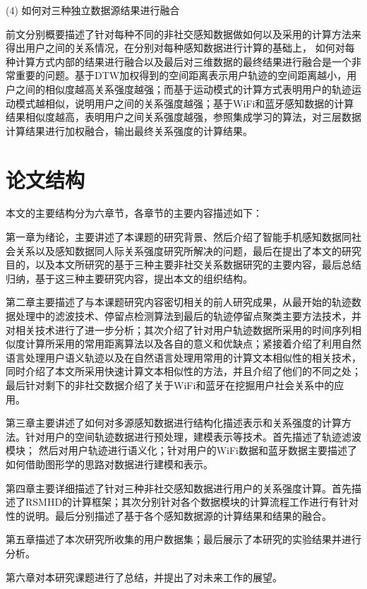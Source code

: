 \par (4) 如何对三种独立数据源结果进行融合
\par 前文分别概要描述了针对每种不同的非社交感知数据做如何以及采用的计算方法来得出用户之间的关系情况，在分别对每种感知数据进行计算的基础上， 如何对每种计算方式内部的结果进行融合以及最后对三维数据的最终结果进行融合是一个非常重要的问题。基于DTW加权得到的空间距离表示用户轨迹的空间距离越小，用户之间的相似度越高关系强度越强；而基于运动模式的计算方式表明用户的轨迹运动模式越相似，说明用户之间的关系强度越强；基于WiFi和蓝牙感知数据的计算结果相似度越高，表明用户之间关系强度越强，参照集成学习的算法，对三层数据计算结果进行加权融合，输出最终关系强度的计算结果。
\section{论文结构}
本文的主要结构分为六章节，各章节的主要内容描述如下：
\par 第一章为绪论，主要讲述了本课题的研究背景、然后介绍了智能手机感知数据同社会关系以及感知数据同人际关系强度研究所解决的问题，最后在提出了本文的研究目的，以及本文所研究的基于三种主要非社交关系数据研究的主要内容，最后总结归纳，基于这三种主要研究内容，提出本文的组织结构。
\par 第二章主要描述了与本课题研究内容密切相关的前人研究成果，从最开始的轨迹数据处理中的滤波技术、停留点检测算法到最后的轨迹停留点聚类主要方法技术，并对相关技术进行了进一步分析；其次介绍了针对用户轨迹数据所采用的时间序列相似度计算所采用的常用距离算法以及各自的意义和优缺点；紧接着介绍了利用自然语言处理用户语义轨迹以及在自然语言处理用常用的计算文本相似性的相关技术，同时介绍了本文所采用快速计算文本相似性的方法，并且介绍了他们的不同之处；最后针对剩下的非社交数据介绍了关于WiFi和蓝牙在挖掘用户社会关系中的应用。

\par 第三章主要讲述了如何对多源感知数据进行结构化描述表示和关系强度的计算方法。针对用户的空间轨迹数据进行预处理，建模表示等技术。首先描述了轨迹滤波模块；%
然后对用户轨迹进行语义化；针对用户的WiFi数据和蓝牙数据主要描述了如何借助图形学的思路对数据进行建模和表示。
\par 第四章主要详细描述了针对三种非社交感知数据进行用户的关系强度计算。首先描述了RSMHD的计算框架；其次分别针对各个数据模块的计算流程工作进行有针对性的说明。最后分别描述了基于各个感知数据源的计算结果和结果的融合。
\par 第五章描述了本次研究所收集的用户数据集；最后展示了本研究的实验结果并进行分析。
\par 第六章对本研究课题进行了总结，并提出了对未来工作的展望。
